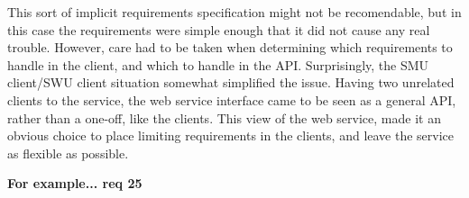 This sort of implicit requirements specification might not be recomendable, but
in this case the requirements were simple enough that it did not cause any real
trouble. However, care had to be taken when determining which requirements to
handle in the client, and which to handle in the API. Surprisingly, the SMU
client/SWU client situation somewhat simplified the issue. Having two
unrelated clients to the service, the web service interface came to be seen as a
general API, rather than a one-off, like the clients.
This view of the web service, made it an obvious choice to place
limiting requirements in the clients, and leave the service as flexible as
possible.

\textbf{For example... req 25}
